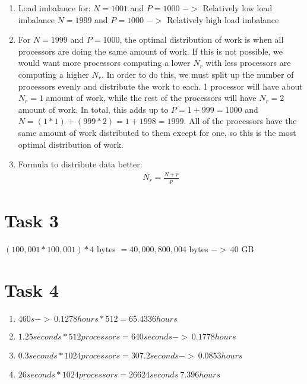 \documentclass{article}
\begin{document}
\begin{enumerate}[label=(\alph*)]
    \item Load imbalance for: 
    \newline $N = 1001$ and $P = 1000$ $->$ Relatively low load imbalance
    \newline $N = 1999$ and $P = 1000$ $->$ Relatively high load imbalance
    \item For $N = 1999$ and $P = 1000$, the optimal distribution of work is when all processors are doing the same amount of work. If this is not possible, we would want more processors computing a lower $N_r$ with less processors are computing a higher $N_r$. In order to do this, we must split up the number of processors evenly and distribute the work to each. 1 processor will have about $N_r = 1$ amount of work, while the rest of the processors will have $N_r = 2$ amount of work. In total, this adds up to $P = 1 + 999 = 1000$ and $N = (1 * 1) + (999 * 2) = 1 + 1998 = 1999$. All of the processors have the same amount of work distributed to them except for one, so this is the most optimal distribution of work. 
    
    \item Formula to distribute data better:
    \begin{align}
        N_r = \frac{N+r}{p}
    \end{align}
    
\end{enumerate}

\maketitle
\section*{Task 3}

$(100,001 * 100,001) * 4$ bytes $= 40,000,800,004$ bytes $-> ~ 40$ GB

\maketitle
\section*{Task 4}

\begin{enumerate}[label=(\alph*)]

\item $460s -> ~ 0.1278 hours * 512 = 65.4336 hours$

\item $1.25seconds * 512 processors = 640 seconds-> ~ 0.1778 hours$

\item $0.3 seconds * 1024 processors  = 307.2 seconds -> ~ 0.0853 hours$

\item $26seconds * 1024 processors = 26624 seconds ~ 7.396 hours$

\end{enumerate}
\end{document}
